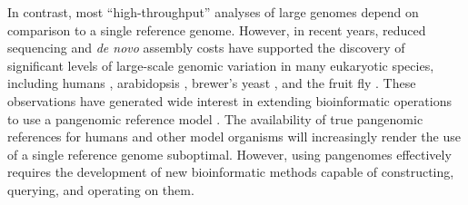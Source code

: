 

In contrast, most ``high-throughput'' analyses of large genomes depend on comparison to a single reference genome.
However, in recent years, reduced sequencing and \emph{de novo} assembly costs have supported the discovery of significant levels of large-scale genomic variation in many eukaryotic species, including humans \cite{sudmant2015integrated,Hehir-Kwa2016-hb,chaisson2018multi,Audano_2019}, arabidopsis \cite{alonso2016arabidopsis}, brewer's yeast \cite{yue2017contrasting}, and the fruit fly \cite{chakraborty2018hidden}.
These observations have generated wide interest in extending bioinformatic operations to use a pangenomic reference model \cite{computational2016computational}.
The availability of true pangenomic references for humans \cite{Church2015-vt} and other model organisms will increasingly render the use of a single reference genome suboptimal.
However, using pangenomes effectively requires the development of new bioinformatic methods capable of constructing, querying, and operating on them.

